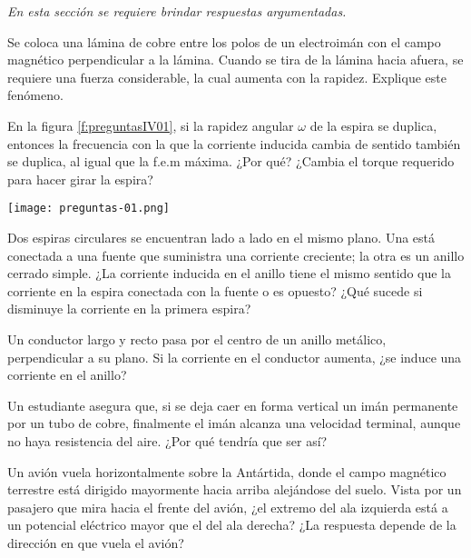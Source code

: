 \textit{En esta sección se requiere brindar respuestas argumentadas.}
\setcounter{figure}{0}
%
\begin{Exercise}
    Se coloca una lámina de cobre entre los polos de un electroimán con el campo magnético perpendicular a la lámina. Cuando se tira de la lámina hacia afuera, se requiere una fuerza considerable, la cual aumenta con la rapidez. Explique este fenómeno.
\end{Exercise}
%
\begin{Exercise}\label{p:preguntasIV01}
    En la figura \ref{f:preguntasIV01}, si la rapidez angular $\omega$ de la espira se duplica, entonces la frecuencia con la que la corriente inducida cambia de sentido también se duplica, al igual que la f.e.m máxima. ¿Por qué? ¿Cambia el torque requerido para hacer girar la espira?
\end{Exercise}
%
\begin{center}
  \texttt{[image: preguntas-01.png]}
\end{center}
%
\begin{Exercise}
    Dos espiras circulares se encuentran lado a lado en el mismo plano. Una está conectada a una fuente que suministra una corriente creciente; la otra es un anillo cerrado simple. ¿La corriente inducida en el anillo tiene el mismo sentido que la corriente en la espira conectada con la fuente o es opuesto? ¿Qué sucede si disminuye la corriente en la primera espira?
\end{Exercise}
%
\begin{Exercise}
    Un conductor largo y recto pasa por el centro de un anillo metálico, perpendicular a su plano. Si la corriente en el conductor aumenta, ¿se induce una corriente en el anillo?
\end{Exercise}
%
\begin{Exercise}
    Un estudiante asegura que, si se deja caer en forma vertical un imán permanente por un tubo de cobre, finalmente el imán alcanza una velocidad terminal, aunque no haya resistencia del aire. ¿Por qué tendría que ser así?
\end{Exercise}
%
\begin{Exercise}
    Un avión vuela horizontalmente sobre la Antártida, donde el campo magnético terrestre está dirigido mayormente hacia arriba alejándose del suelo. Vista por un pasajero que mira hacia el frente del avión, ¿el extremo del ala izquierda está a un potencial eléctrico mayor que el del ala derecha? ¿La respuesta depende de la dirección en que vuela el avión?
\end{Exercise}
